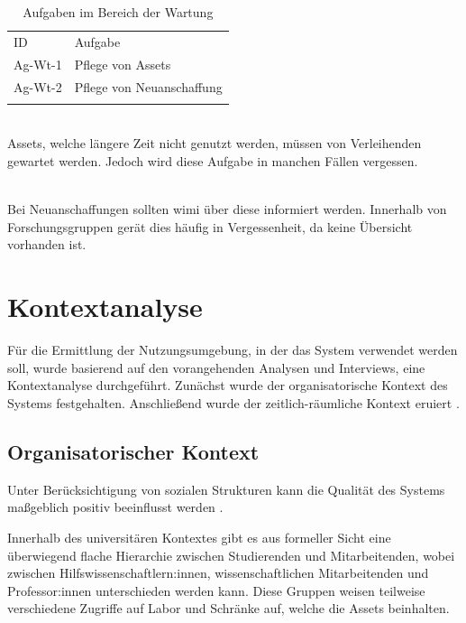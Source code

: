 \begin{table}[h]
        \centering
        \caption{Aufgaben im Bereich der Wartung}
        \begin{tabular}{ll}
                \arrayrulecolor{maincolor}\hline
                \sffamily\color{maincolor}ID & \sffamily\color{maincolor}Aufgabe
                \\
                \arrayrulecolor{maincolor}\hline
                Ag-Wt-1                      & Pflege von Assets
                \\
                Ag-Wt-2                      & Pflege von Neuanschaffung
                \\
                \arrayrulecolor{maincolor}\hline
        \end{tabular}
        \label{table:Ag-Wt}
\end{table}

{\sffamily\color{maincolor}{Ag-Wt-1 | Pflege von Assets}}\\
Assets, welche längere Zeit nicht genutzt werden, müssen von Verleihenden
gewartet werden. Jedoch wird diese Aufgabe in manchen Fällen vergessen.

        {\sffamily\color{maincolor}{Ag-Wt-2 | Pflege von Assets}} \\
Bei Neuanschaffungen sollten \ac{wimi} über diese informiert werden. Innerhalb
von Forschungsgruppen gerät dies häufig in Vergessenheit, da keine Übersicht
vorhanden ist.

\section{Kontextanalyse}
\label{section:kontext}

Für die Ermittlung der Nutzungsumgebung, in der das System verwendet werden
soll, wurde basierend auf den vorangehenden Analysen und Interviews, eine
Kontextanalyse durchgeführt. Zunächst wurde der organisatorische Kontext des
Systems festgehalten. Anschließend wurde der zeitlich-räumliche Kontext eruiert
\cite{HerczegSoftEg2018}.

\subsection{Organisatorischer Kontext}
Unter Berücksichtigung von sozialen Strukturen kann die Qualität des Systems
maßgeblich positiv beeinflusst werden \cite{HerczegSoftEg2018}.

Innerhalb des universitären Kontextes gibt es aus formeller Sicht eine
überwiegend flache Hierarchie zwischen Studierenden und Mitarbeitenden, wobei
zwischen Hilfswissenschaftlern:innen, wissenschaftlichen Mitarbeitenden und
Professor:innen unterschieden werden kann. Diese Gruppen weisen teilweise
verschiedene Zugriffe auf Labor und Schränke auf, welche die Assets beinhalten.

